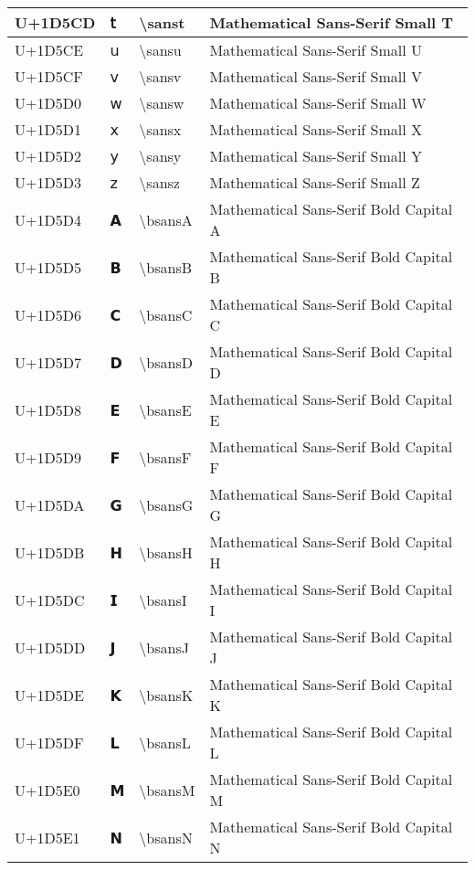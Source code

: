 \begin{table}[h]
\begin{tabulary}{\linewidth}{|L|L|L|L|}
\hline
U+1D5CD & 𝗍 & {\textbackslash}sanst & Mathematical Sans-Serif Small T \\
\hline
U+1D5CE & 𝗎 & {\textbackslash}sansu & Mathematical Sans-Serif Small U \\
\hline
U+1D5CF & 𝗏 & {\textbackslash}sansv & Mathematical Sans-Serif Small V \\
\hline
U+1D5D0 & 𝗐 & {\textbackslash}sansw & Mathematical Sans-Serif Small W \\
\hline
U+1D5D1 & 𝗑 & {\textbackslash}sansx & Mathematical Sans-Serif Small X \\
\hline
U+1D5D2 & 𝗒 & {\textbackslash}sansy & Mathematical Sans-Serif Small Y \\
\hline
U+1D5D3 & 𝗓 & {\textbackslash}sansz & Mathematical Sans-Serif Small Z \\
\hline
U+1D5D4 & 𝗔 & {\textbackslash}bsansA & Mathematical Sans-Serif Bold Capital A \\
\hline
U+1D5D5 & 𝗕 & {\textbackslash}bsansB & Mathematical Sans-Serif Bold Capital B \\
\hline
U+1D5D6 & 𝗖 & {\textbackslash}bsansC & Mathematical Sans-Serif Bold Capital C \\
\hline
U+1D5D7 & 𝗗 & {\textbackslash}bsansD & Mathematical Sans-Serif Bold Capital D \\
\hline
U+1D5D8 & 𝗘 & {\textbackslash}bsansE & Mathematical Sans-Serif Bold Capital E \\
\hline
U+1D5D9 & 𝗙 & {\textbackslash}bsansF & Mathematical Sans-Serif Bold Capital F \\
\hline
U+1D5DA & 𝗚 & {\textbackslash}bsansG & Mathematical Sans-Serif Bold Capital G \\
\hline
U+1D5DB & 𝗛 & {\textbackslash}bsansH & Mathematical Sans-Serif Bold Capital H \\
\hline
U+1D5DC & 𝗜 & {\textbackslash}bsansI & Mathematical Sans-Serif Bold Capital I \\
\hline
U+1D5DD & 𝗝 & {\textbackslash}bsansJ & Mathematical Sans-Serif Bold Capital J \\
\hline
U+1D5DE & 𝗞 & {\textbackslash}bsansK & Mathematical Sans-Serif Bold Capital K \\
\hline
U+1D5DF & 𝗟 & {\textbackslash}bsansL & Mathematical Sans-Serif Bold Capital L \\
\hline
U+1D5E0 & 𝗠 & {\textbackslash}bsansM & Mathematical Sans-Serif Bold Capital M \\
\hline
U+1D5E1 & 𝗡 & {\textbackslash}bsansN & Mathematical Sans-Serif Bold Capital N \\

\end{tabulary}
\end{table}
